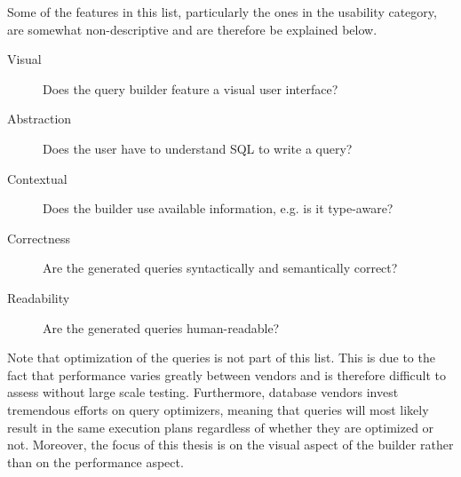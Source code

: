 \documentclass[11pt,a4paper]{globis-book}
\begin{document}
Some of the features in this list, particularly the ones in the usability category, are somewhat non-descriptive and are therefore be explained below.
\begin{description}
\item[Visual] Does the query builder feature a visual user interface?
\item[Abstraction] Does the user have to understand SQL to write a query?
\item[Contextual] Does the builder use available information, e.g. is it type-aware?
\item[Correctness] Are the generated queries syntactically and semantically correct?
\item[Readability] Are the generated queries human-readable?
\end{description}
Note that optimization of the queries is not part of this list. This is due to the fact that performance varies greatly between vendors and is therefore difficult to assess without large scale testing. Furthermore, database vendors invest tremendous efforts on query optimizers, meaning that queries will most likely result in the same execution plans regardless of whether they are optimized or not. Moreover, the focus of this thesis is on the visual aspect of the builder rather than on the performance aspect.
\end{document}
